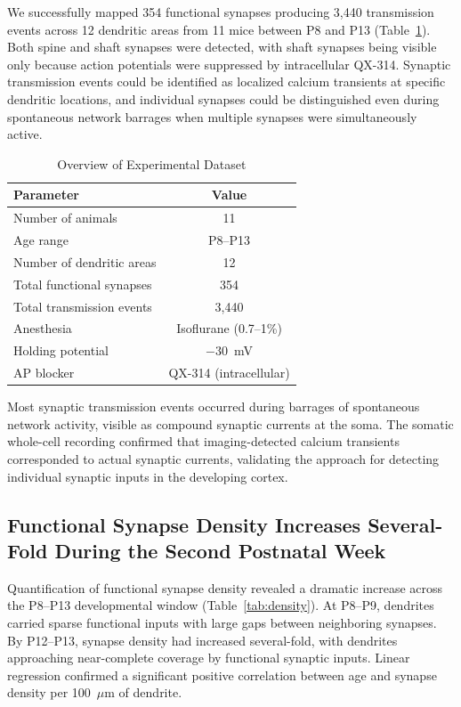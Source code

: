\documentclass[11pt]{article}
\begin{document}
We successfully mapped 354 functional synapses producing 3,440 transmission events across 12 dendritic areas from 11 mice between P8 and P13 (Table~\ref{tab:overview}). Both spine and shaft synapses were detected, with shaft synapses being visible only because action potentials were suppressed by intracellular QX-314. Synaptic transmission events could be identified as localized calcium transients at specific dendritic locations, and individual synapses could be distinguished even during spontaneous network barrages when multiple synapses were simultaneously active.

\begin{table}[ht]
\centering
\caption{Overview of Experimental Dataset}
\label{tab:overview}
\begin{tabular}{lc}
\toprule
\textbf{Parameter} & \textbf{Value} \\
\midrule
Number of animals & 11 \\
Age range & P8--P13 \\
Number of dendritic areas & 12 \\
Total functional synapses & 354 \\
Total transmission events & 3,440 \\
Anesthesia & Isoflurane (0.7--1\%) \\
Holding potential & $-30$~mV \\
AP blocker & QX-314 (intracellular) \\
\bottomrule
\end{tabular}
\end{table}

Most synaptic transmission events occurred during barrages of spontaneous network activity, visible as compound synaptic currents at the soma. The somatic whole-cell recording confirmed that imaging-detected calcium transients corresponded to actual synaptic currents, validating the approach for detecting individual synaptic inputs in the developing cortex.

\subsection{Functional Synapse Density Increases Several-Fold During the Second Postnatal Week}

Quantification of functional synapse density revealed a dramatic increase across the P8--P13 developmental window (Table~\ref{tab:density}). At P8--P9, dendrites carried sparse functional inputs with large gaps between neighboring synapses. By P12--P13, synapse density had increased several-fold, with dendrites approaching near-complete coverage by functional synaptic inputs. Linear regression confirmed a significant positive correlation between age and synapse density per 100~$\mu$m of dendrite.
\end{document}
